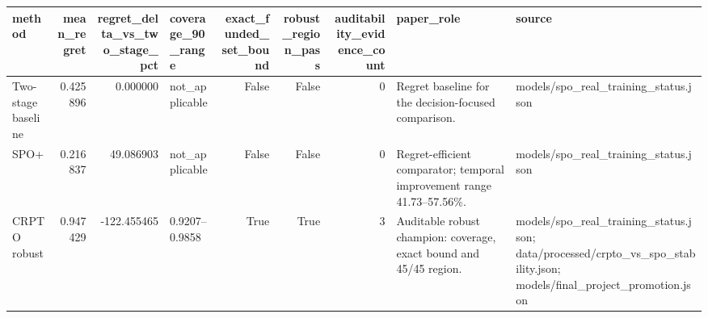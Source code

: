 \begin{tabular}{lrrlrrrll}
\toprule
method & mean\_regret & regret\_delta\_vs\_two\_stage\_pct & coverage\_90\_range & exact\_funded\_set\_bound & robust\_region\_pass & auditability\_evidence\_count & paper\_role & source \\
\midrule
Two-stage baseline & 0.425896 & 0.000000 & not\_applicable & False & False & 0 & Regret baseline for the decision-focused comparison. & models/spo\_real\_training\_status.json \\
SPO+ & 0.216837 & 49.086903 & not\_applicable & False & False & 0 & Regret-efficient comparator; temporal improvement range 41.73--57.56\%. & models/spo\_real\_training\_status.json \\
CRPTO robust & 0.947429 & -122.455465 & 0.9207--0.9858 & True & True & 3 & Auditable robust champion: coverage, exact bound and 45/45 region. & models/spo\_real\_training\_status.json; data/processed/crpto\_vs\_spo\_stability.json; models/final\_project\_promotion.json \\
\bottomrule
\end{tabular}
